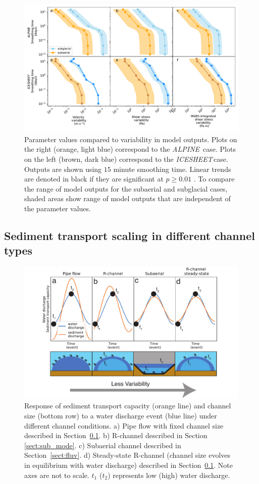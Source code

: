 \documentclass[tc, manuscript]{copernicus}
\newcommand{\alpine}{\textit{ALPINE}\,}
\newcommand{\icesheet}{\textit{ICESHEET}\,}
\begin{document}
\begin{figure}[hbt!]
  \centering
  \includegraphics[width=0.7\linewidth]{Fig4.pdf}
  \caption{Parameter values compared to variability in model outputs.
    Plots on the right (orange, light blue) correspond to the \alpine{} case. Plots on the left (brown, dark blue) correspond to the \icesheet case.
    Outputs are shown using $15$ minute smoothing time.
    Linear trends are denoted in black if they are significant at  $p\ge0.01$ .
    To compare the range of model outputs for the subaerial and subglacial cases, shaded areas show range of model outputs that are independent of the parameter values. 
  }
  \label{fig:params}
\end{figure}

\FloatBarrier
\subsection{Sediment transport scaling in different channel types}
\label{sect:scaling}

\begin{figure}[hbt!]
  \centering
  \includegraphics[width=0.7\linewidth]{Fig7.pdf}
  \caption{Response of sediment transport capacity (orange line) and channel size (bottom row) to a water discharge event (blue line) under different channel conditions.
    a) Pipe flow with fixed channel size described in Section~\ref{sect:scaling}.
    b) R-channel described in Section \ref{sect:sub_mode}.
    c) Subaerial channel described in Section~\ref{sect:fluv}.
    d) Steady-state R-channel (channel size evolves in equilibrium with water discharge) described in Section~\ref{sect:scaling}.
    Note axes are not to scale.
    $t_1$ ($t_2$) represents low (high) water discharge. 
  }
  \label{fig:chan_types}
\end{figure}
\end{document}
